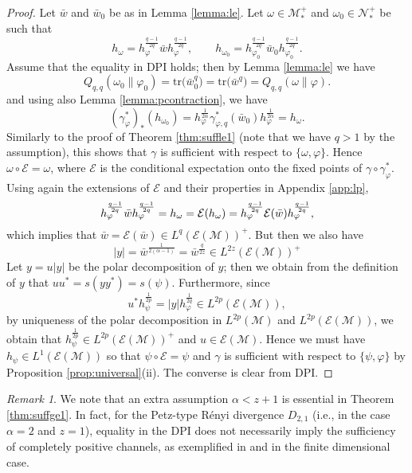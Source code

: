 \documentclass[12pt]{article}
\theoremstyle{definition}
\theoremstyle{remark}
\newtheorem{remark}[theorem]{Remark}
\numberwithin{equation}{section}
\def\cE{\mathcal E}
\def\Me{\mathcal M}
\def\Ne{\mathcal N}
\def\Tr{\mathrm{tr}}
\def\ffi{\varphi}
\begin{document}
\begin{proof} Let $\bar w$ and $\bar w_0$ be as in Lemma \ref{lemma:le}. Let $\omega\in
\Me_*^+$ and $\omega_0\in \Ne_*^+$ be such that
\[
h_\omega=h_\ffi^{\frac{q-1}{2q}}\bar wh_\ffi^{\frac{q-1}{2q}},\qquad
h_{\omega_0}=h_{\ffi_0}^{\frac{q-1}{2q}}\bar w_0h_{\ffi_0}^{\frac{q-1}{2q}}.
\]
 Assume that the equality in DPI holds; then by Lemma
\ref{lemma:le} we have
\[
Q_{q,q}(\omega_0\|\varphi_0)=\Tr\bigl(\bar w_0^q\bigr)=\Tr\bigl(\bar
w^q\bigr)=Q_{q,q}(\omega\|\varphi).
\]
and using also Lemma \ref{lemma:pcontraction}, we have
\[
(\gamma^*_\ffi)_*(h_{\omega_0})=h_\ffi^{\frac1{2\alpha}}\gamma^*_{\ffi,q}(\bar
w_0)h_\ffi^{\frac1{2\alpha}}=h_\omega.
\]
Similarly {to} the proof of Theorem \ref{thm:suffle1} (note that we
have $q>1$ by the assumption), this shows that $\gamma$ is sufficient
with respect to $\{\omega,\ffi\}$. Hence $\omega\circ \cE=\omega$, where $\cE$ is the
conditional expectation onto the fixed points of $\gamma\circ\gamma^*_\ffi$.
Using again the extensions of $\cE$ and their properties in  Appendix \ref{app:lp},
\[
h_\varphi^{q-1\over2q}\bar
wh_\varphi^{q-1\over 2q}=h_\omega=\cE(h_\omega)=h_\varphi^{q-1\over 2q}\cE(\bar
w)h_\varphi^{q-1\over 2q},
\]
which implies that $\bar w=\cE(\bar w)\in L^q(\cE(\Me))^+$. But then we also have
\[
|y|=\bar w^{\frac1{2(\alpha-1)}}=\bar w^{\frac{q}{2z}}\in L^{2z}(\cE(\Me))^+
\]
Let $y=u|y|$ be the polar decomposition of $y$; then we obtain from the definition of $y$ that
$uu^*=s(yy^*)=s(\psi)$. Furthermore, since
\[
u^*h_\psi^{\frac1{2p}}=|y|h_\varphi^{\frac1{2q}}\in L^{2p}(\cE(\Me)),
\]
by uniqueness of the polar decomposition in $L^{2p}(\Me)$ and $L^{2p}(\cE(\Me))$, we
obtain that $h_{\psi}^{\frac1{2p}}\in L^{2p}(\cE(\Me))^+$ and $u\in \cE(\Me)$. Hence we must
have $h_\psi\in L^1(\cE(\Me))$ so that $\psi\circ\cE=\psi$ and $\gamma$ is sufficient with
respect to $\{\psi,\ffi\}$ by Proposition \ref{prop:universal}(ii). The converse is clear from DPI.
\end{proof}

\begin{remark}
We note that an extra assumption $\alpha<z+1$ is essential in Theorem \ref{thm:suffge1}.
In fact, for the Petz-type R\'enyi divergence $D_{2,1}$ (i.e., in the case $\alpha=2$ and $z=1$),
equality in the DPI does not necessarily imply the sufficiency of completely positive channels,
as exemplified in \cite[Example 2.2]{jencova2010markov} and \cite[Example 4.8]{hiai2017different}
in the finite dimensional case.
\end{remark}
\end{document}
